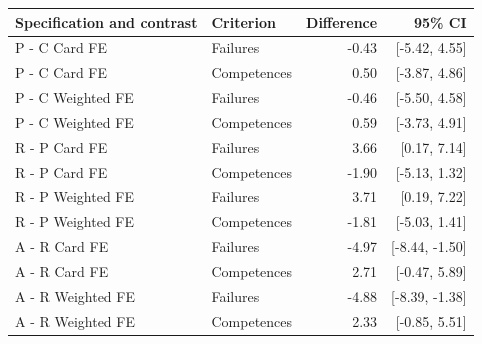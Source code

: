 \begin{tabular}{@{}p{5cm}lrr@{}}
\toprule
Specification and contrast & Criterion & Difference & 95\% CI \\
\midrule
P - C Card FE & Failures & -0.43 & [-5.42, 4.55] \\
P - C Card FE & Competences & 0.50 & [-3.87, 4.86] \\
P - C Weighted FE & Failures & -0.46 & [-5.50, 4.58] \\
P - C Weighted FE & Competences & 0.59 & [-3.73, 4.91] \\
R - P Card FE & Failures & 3.66 & [0.17, 7.14] \\
R - P Card FE & Competences & -1.90 & [-5.13, 1.32] \\
R - P Weighted FE & Failures & 3.71 & [0.19, 7.22] \\
R - P Weighted FE & Competences & -1.81 & [-5.03, 1.41] \\
A - R Card FE & Failures & -4.97 & [-8.44, -1.50] \\
A - R Card FE & Competences & 2.71 & [-0.47, 5.89] \\
A - R Weighted FE & Failures & -4.88 & [-8.39, -1.38] \\
A - R Weighted FE & Competences & 2.33 & [-0.85, 5.51] \\
\bottomrule
\end{tabular}
